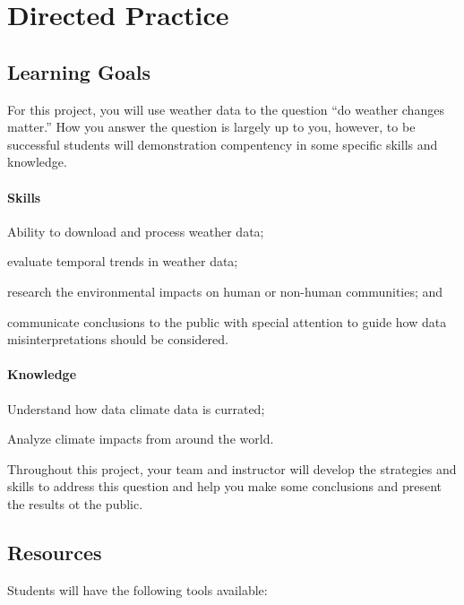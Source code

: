 \documentclass{article}\usepackage[]{graphicx}\usepackage[]{color}
\newenvironment{itemize*}%
  {\begin{itemize}%
    \setlength{\itemsep}{0pt}%
    \setlength{\parskip}{0pt}}%
  {\end{itemize}}
\begin{document}
\section{Directed Practice}

\subsection{Learning Goals}

For this project, you will use weather data to the question ``do weather changes matter.'' How you answer the question is largely up to you, however, to be successful students will demonstration compentency in some specific skills and knowledge. 

\paragraph{Skills}

\begin{itemize*}
  \item Ability to download and process weather data;
  \item evaluate temporal trends in weather data;
  \item research the environmental impacts on human or non-human communities; and
  \item communicate conclusions to the public with special attention to guide how data misinterpretations should be considered.
\end{itemize*}

\paragraph{Knowledge}
\begin{itemize*}
  \item Understand how data climate data is currated;
  \item Analyze climate impacts from around the world.
\end{itemize*}

Throughout this project, your team and instructor will develop the strategies and skills to address this question and help you make some conclusions and present the results ot the public.

\subsection{Resources}

Students will have the following tools available:
\end{document}
